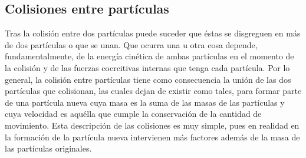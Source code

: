 %
%
%
%

\subsection{Colisiones entre partículas} \label{subsec:colisiones}

\par Tras la colisión entre dos partículas puede suceder que éstas se disgreguen en más de dos partículas o que se unan. Que ocurra una u otra cosa depende, fundamentalmente, de la energía cinética de ambas partículas en el momento de la colisión y de las fuerzas coercitivas internas que tenga cada partícula. Por lo general, la colisión entre partículas tiene como consecuencia la unión de las dos partículas que colisionan, las cuales dejan de existir como tales, para formar parte de una partícula nueva cuya masa es la suma de las masas de las partículas y cuya velocidad es aquélla que cumple la conservación de la cantidad de movimiento. Esta descripción de las colisiones es muy simple, pues en realidad en la formación de la partícula nueva intervienen más factores además de la masa de las partículas originales.

